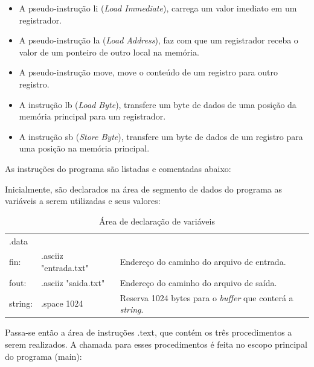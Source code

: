 \documentclass[12pt,a4paper]{article}
\numberwithin{figure}{subsection}
\numberwithin{table}{subsection}
\begin{document}
\begin{itemize}[leftmargin=1.3cm]
\setlength\itemsep{1pt}
	 \item A pseudo-instrução {\ttfamily li} (\textit{Load Immediate}), carrega um valor imediato em um registrador.
	 \item A pseudo-instrução {\ttfamily la} (\textit{Load Address}), faz com que um registrador receba o valor de um ponteiro de outro local na memória.
	 \item A pseudo-instrução {\ttfamily move}, move o conteúdo de um registro para outro registro.
	 \item A instrução {\ttfamily lb} (\textit{Load Byte}), transfere um byte de dados de uma posição da memória principal para um registrador.
	 \item A instrução {\ttfamily sb} (\textit{Store Byte}), transfere um byte de dados de um registro para uma posição na memória principal.
\end{itemize}

As instruções do programa são listadas e comentadas abaixo:

Inicialmente, são declarados na área de segmento de dados do programa as variáveis a serem utilizadas e seus valores:

\begin{table}[H]
	\renewcommand{\arraystretch}{1}
	\centering
	\caption*{Área de declaração de variáveis}
	\label{q2cod:data}
	\begin{tabular}{>{\ttfamily}p{1.2cm} >{\ttfamily}p{4.6cm} p{9.2cm}}
	\toprule
	.data   & &  \\
	fin:    & .asciiz "entrada.txt" &  Endereço do caminho do arquivo de entrada.\\
	fout:   & .asciiz "saida.txt"   &  Endereço do caminho do arquivo de saída.\\
	string: & .space 1024 &  Reserva 1024 bytes para o \textit{buffer} que conterá a \textit{string}. \\
	\bottomrule
	\end{tabular}
\end{table}

Passa-se então a área de instruções {\ttfamily .text}, que contém os três procedimentos a serem realizados. A chamada para esses procedimentos é feita no escopo principal do programa ({\ttfamily main}):
\end{document}
